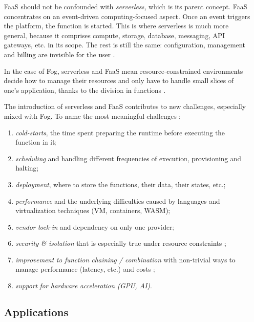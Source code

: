 \gls{FaaS} should not be confounded with \emph{serverless}, which is its parent concept. \gls{FaaS} concentrates on an event-driven computing-focused aspect. Once an event triggers the platform, the function is started. This is where serverless is much more general, because it comprises compute, storage, database, messaging, API gateways, etc. in its scope. The rest is still the same: configuration, management and billing are invisible for the user \cite{ibm_faas_2019}.

In the case of Fog, serverless and \gls{FaaS} mean resource-constrained environments decide how to manage their resources and only have to handle small slices of one's application, thanks to the division in functions \cite{bermbach_auctionwhisk_2021}.

The introduction of serverless and \gls{FaaS} contributes to new challenges, especially mixed with Fog. To name the most meaningful challenges \cite{kjorveziroski_iot_2021}:
\begin{enumerate}
	\item \emph{cold-starts}, the time spent preparing the runtime before executing the function in it;
	\item \emph{scheduling} and handling different frequencies of execution, provisioning and halting;
	\item \emph{deployment}, where to store the functions, their data, their states, etc.;
	\item \emph{performance} and the underlying difficulties caused by languages and virtualization techniques (\gls{VM}, containers, WASM);
	\item \emph{vendor lock-in} and dependency on only one provider;
	\item \emph{security \& isolation} that is especially true under resource constraints \cite{maurice_hello_2017};
	\item \emph{improvement to function chaining / combination} with non-trivial ways to manage performance (latency, etc.) and costs \cite{elgamal_costless_2018};
	\item \emph{support for hardware acceleration (\gls{GPU}, \gls{AI})}.
\end{enumerate}

\subsection {Applications}

